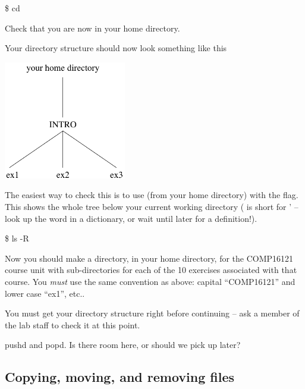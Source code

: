 \begin{ttoutenv}
\$  cd \return
\end{ttoutenv}

Check that you are now in your home directory.

Your directory structure should now look something like this
     \begin{center}
       \includegraphics[width=0.4\textwidth]{images/101-dirs}
     \end{center}

The easiest way to check this is to use (from your home directory)
 with the  flag. This shows the whole tree
below your current working directory ( is short for
'  -- look up the word in a dictionary, or wait until later for a
 definition!).

\begin{ttoutenv}
\$ ls -R 
\end{ttoutenv}
%

  Now you should make a directory, in your home directory, for the COMP16121 course unit
  with
  sub-directories for each of the 10 exercises associated with that
  course. You \emph{must} use the same convention as above:
  capital ``COMP16121'' and lower case ``ex1'', etc..

You must get your directory structure right before continuing -- ask a
member of the lab staff to check it at this point.

\begin{note}
  pushd and popd. Is there room here, or should we pick up later?
\end{note}

\subsection{Copying, moving, and removing files}

